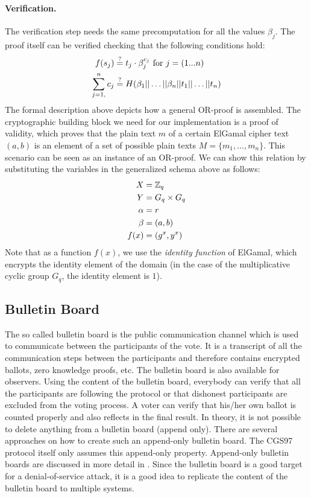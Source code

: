 \documentclass[numbers=noenddot, abstract=on, a4paper, headsepline,
footsepline, oneside, openright, draft=off, listof=leveldown]{scrreprt}
\begin{document}
\paragraph{Verification.} The verification step needs the same precomputation
for all the values $\beta_j$. The proof itself can be verified checking that
the following conditions hold:
\begin{align}
	f(s_j) &\stackrel{?}{=} t_j \cdot \beta_j^{c_j} \text{ for } j=(1...n)
	\notag \\
	 \sum_{j=1,}^n c_j &\stackrel{?}{=}
	 H(\beta_1||\ldots||\beta_n||t_1||\ldots||t_n)
	 \notag
\end{align}
The formal description above depicts how a general OR-proof is assembled. The
cryptographic building block we need for our implementation is a proof of
validity, which proves that the plain text $m$ of a certain ElGamal cipher text
$(a, b)$ is an element of a set of possible plain texts $M=\{m_1, \ldots, m_n\}$. This
scenario can be seen as an instance of an OR-proof. We can show this relation by
substituting the variables in the generalized schema above as follows:
\begin{align}
  X &= \mathbb{Z}_q \notag \\
  Y &= G_q \times G_q \notag \\
  \alpha &=r \notag \\
  \beta &=(a, b) \notag \\
  f(x) &= (g^x, y^x) \notag
\end{align} 
Note that as a function $f(x)$, we use the \emph{identity function} of ElGamal,
which encrypts the identity element of the domain (in the case of the
multiplicative cyclic group $G_q$, the identity element is $1$).

\subsection{Bulletin Board}
\label{sec:bulletinboard}
The so called bulletin board is the public communication channel which is used
to communicate between the participants of the vote. It is a
transcript of all the communication steps between the participants and therefore
contains encrypted ballots, zero knowledge proofs, etc. The bulletin board is
also available for observers. Using the content of the bulletin board, everybody
can verify that all the participants are following the protocol or that
dishonest participants are excluded from the voting process. A voter can verify
that his/her own ballot is counted properly and also reflects in the final
result. In theory, it is not possible to delete anything from a bulletin board
(append only). There are several approaches on how to create such an
append-only bulletin board. The CGS97 protocol itself only assumes this
append-only property. Append-only bulletin boards are discussed in more detail
in \cite{HL09}. Since the bulletin board is a good target for a
denial-of-service attack, it is a good idea to replicate the content of the bulletin board to multiple systems.
\end{document}

